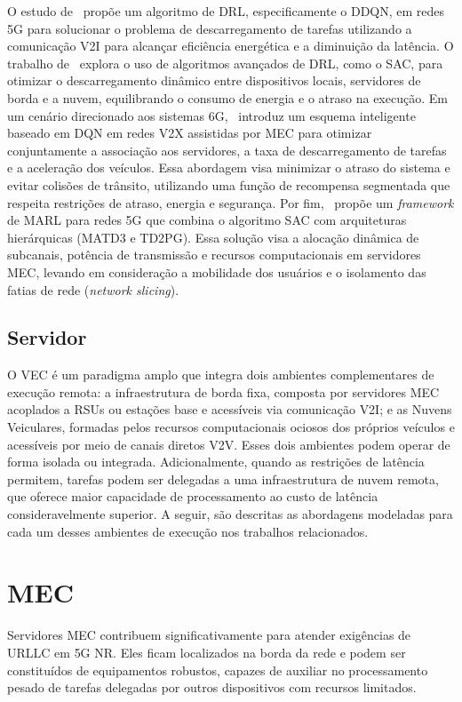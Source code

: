 O estudo de~\cite{Moghaddasi2023} propõe um algoritmo de \gls{DRL}, especificamente o \gls{DDQN}, em redes \gls{5G} para solucionar o problema de descarregamento de tarefas utilizando a comunicação \gls{V2I} para alcançar eficiência energética e a diminuição da latência. O trabalho de~\cite{sidwini} explora o uso de algoritmos avançados de \gls{DRL}, como o \gls{SAC}, para otimizar o descarregamento dinâmico entre dispositivos locais, servidores de borda e a nuvem, equilibrando o consumo de energia e o atraso na execução. Em um cenário direcionado aos sistemas \gls{6G},~\cite{li2025} introduz um esquema inteligente baseado em \gls{DQN} em redes \gls{V2X} assistidas por \gls{MEC} para otimizar conjuntamente a associação aos servidores, a taxa de descarregamento de tarefas e a aceleração dos veículos. Essa abordagem visa minimizar o atraso do sistema e evitar colisões de trânsito, utilizando uma função de recompensa segmentada que respeita restrições de atraso, energia e segurança. Por fim,~\cite{meghamala2025} propõe um \textit{framework} de \gls{MARL} para redes \gls{5G} que combina o algoritmo \gls{SAC} com arquiteturas hierárquicas (\gls{MATD3} e \gls{TD2PG}). Essa solução visa a alocação dinâmica de subcanais, potência de transmissão e recursos computacionais em servidores \gls{MEC}, levando em consideração a mobilidade dos usuários e o isolamento das fatias de rede (\textit{network slicing}).

\subsection{Servidor}
O \gls{VEC} é um paradigma amplo que integra dois ambientes complementares de execução remota: a infraestrutura de borda fixa, composta por servidores \gls{MEC} acoplados a \glspl{RSU} ou estações base e acessíveis via comunicação \gls{V2I}; e as Nuvens Veiculares, formadas pelos recursos computacionais ociosos dos próprios veículos e acessíveis por meio de canais diretos \gls{V2V}. Esses dois ambientes podem operar de forma isolada ou integrada. Adicionalmente, quando as restrições de latência permitem, tarefas podem ser delegadas a uma infraestrutura de nuvem remota, que oferece maior capacidade de processamento ao custo de latência consideravelmente superior. A seguir, são descritas as abordagens modeladas para cada um desses ambientes de execução nos trabalhos relacionados.

\section*{\texorpdfstring{\gls{MEC}}{\gls{MEC}}}
Servidores \gls{MEC} contribuem significativamente para atender exigências de \gls{URLLC} em \gls{5G} \gls{NR}. Eles ficam localizados na borda da rede e podem ser constituídos de equipamentos robustos, capazes de auxiliar no processamento pesado de tarefas delegadas por outros dispositivos com recursos limitados.

